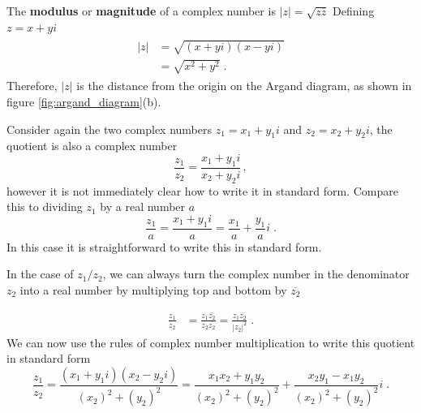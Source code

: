 The \textbf{modulus} or \textbf{magnitude} of a complex number is $\left|z\right|=\sqrt{z\overline{z}}$ Defining $z=x+yi$
\begin{align}
\begin{split}
    \left|z\right| &=\sqrt{(x+yi)(x-yi)} \\[4pt]
    &=\sqrt{{x}^{2}+{y}^{2}} \; .
\end{split}
\end{align}
Therefore, $|z|$ is the distance from the origin on the Argand diagram, as shown in figure \ref{fig:argand_diagram}(b).

Consider again the two complex numbers ${z}_{1}={x}_{1}+{y}_{1}i$ and ${z}_{2}={x}_{2}+{y}_{2}i$, the quotient is also a complex number
\[
\frac{{z}_{1}}{{z}_{2}}=\frac{{x}_{1}+{y}_{1}i}{{x}_{2}+{y}_{2}i} \, , 
\]
however it is not immediately clear how to write it in standard form. Compare this to dividing ${z}_{1}$ by a real number $a$
\[
\frac{{z}_{1}}{a}=\frac{{x}_{1}+{y}_{1}i}{a}=\frac{{x}_{1}}{a}+\frac{{y}_{1}}{a}i \; .
\]
In this case it is straightforward to write this in standard form. 

In the case of $z_1/z_2$, we can always turn the complex number in the denominator $z_2$ into a real number by multiplying top and bottom by $\overline{{z}_{2}}$

\begin{align}
\frac{{z}_{1}}{{z}_{2}}&=\frac{{z}_{1}\overline{{z}_{2}}}{{z}_{2}\overline{{z}_{2}}} = \frac{{z}_{1}\overline{{z}_{2}}}{{\left|{z}_{2}\right|}^{2}} \; .
\end{align}
We can now use the rules of complex number multiplication to write this quotient in standard form
\[
\frac{{z}_{1}}{{z}_{2}}=\frac{({x}_{1}+{y}_{1}i)({x}_{2}-{y}_{2}i)}{{\left({x}_{2}\right)}^{2}+{\left({y}_{2}\right)}^{2}} = {\frac{{x}_{1}{x}_{2}+{y}_{1}{y}_{2}}{{\left({x}_{2}\right)}^{2}+{\left({y}_{2}\right)}^{2}}} + {\frac{{x}_{2}{y}_{1}-{x}_{1}{y}_{2}}{{\left({x}_{2}\right)}^{2}+{\left({y}_{2}\right)}^{2}}}i \; .
\]

